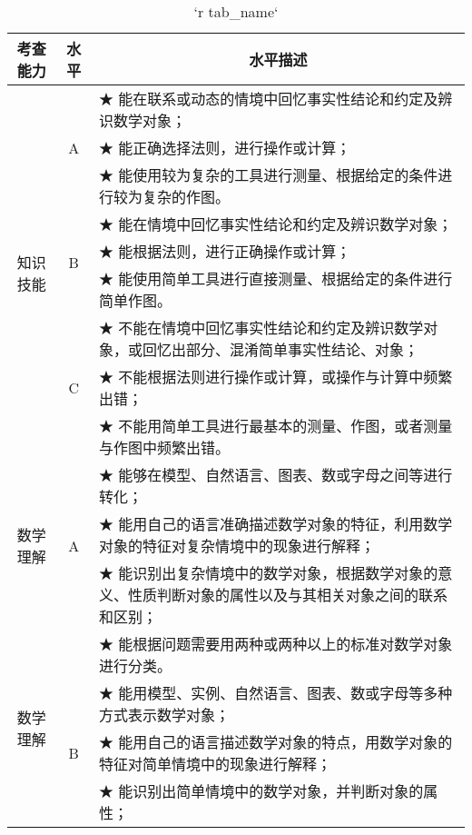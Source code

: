 \begin{itshape}
\small
\begin{longtable}{|c|c|p{12cm}|}
\caption{`r tab_name`} \label{tab: `r tab_name`} \\
 
\hline
 \multicolumn{1}{|c}{\normalsize 考查能力} &  \multicolumn{1}{|c|}{\normalsize 水平} &  \multicolumn{1}{c|}{\normalsize 水平描述} \\ 
\hline
   
   \multirow{9}{*}{知识技能}  & \multirow{3}{*}{A}  & ★ 能在联系或动态的情境中回忆事实性结论和约定及辨识数学对象；  \\    
   & &  ★ 能正确选择法则，进行操作或计算； \\  
   & &  ★ 能使用较为复杂的工具进行测量、根据给定的条件进行较为复杂的作图。 \\    
\cline{2-3}      

   &   \multirow{3}{*}{B}  &  ★ 能在情境中回忆事实性结论和约定及辨识数学对象；\\  
   & &  ★ 能根据法则，进行正确操作或计算；\\  
   & &  ★ 能使用简单工具进行直接测量、根据给定的条件进行简单作图。 \\    
\cline{2-3}      

   &   \multirow{3}{*}{C}  &  ★ 不能在情境中回忆事实性结论和约定及辨识数学对象，或回忆出部分、混淆简单事实性结论、对象；\\  
   & &  ★ 不能根据法则进行操作或计算，或操作与计算中频繁出错；\\  
   & &  ★ 不能用简单工具进行最基本的测量、作图，或者测量与作图中频繁出错。 \\   
\hline
   
   \multirow{3}{*}{数学理解}  & \multirow{3}{*}{A}  & ★   能够在模型、自然语言、图表、数或字母之间等进行转化； \\    
   & &  ★ 能用自己的语言准确描述数学对象的特征，利用数学对象的特征对复杂情境中的现象进行解释； \\  
   & &  ★ 能识别出复杂情境中的数学对象，根据数学对象的意义、性质判断对象的属性以及与其相关对象之间的联系和区别；\\    
   \multirow{9}{*}{数学理解} & &  ★ 能根据问题需要用两种或两种以上的标准对数学对象进行分类。\\    
\cline{2-3}      

   &   \multirow{4}{*}{B}  &  ★ 能用模型、实例、自然语言、图表、数或字母等多种方式表示数学对象；\\  
   & &  ★   能用自己的语言描述数学对象的特点，用数学对象的特征对简单情境中的现象进行解释；\\  
   & &  ★ 能识别出简单情境中的数学对象，并判断对象的属性； \\ 
   

\end{longtable}
\end{itshape}
